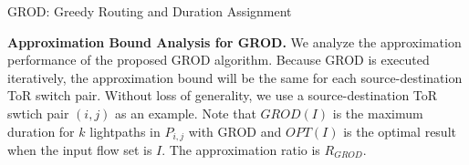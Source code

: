 {\small
\begin{algorithm}
\caption{GROD: Greedy Routing and Duration Assignment}\label{alg:GROD}
\begin{algorithmic}[2]

    \ENDFOR
\ENDFOR

\end{algorithmic}
\end{algorithm}
}


\textbf{Approximation Bound Analysis for GROD.} We analyze the approximation performance of the proposed GROD algorithm. Because GROD is executed iteratively, the approximation bound will be the same for each source-destination ToR switch pair.  Without loss of generality, we use a source-destination ToR swtich pair $(i,j)$ as an example. Note that $GROD(I)$ is the maximum duration for $k$ lightpaths in $P_{i,j}$ with GROD and $OPT(I)$ is the optimal result when the input flow set is $I$. The approximation ratio is $R_{GROD}$.

